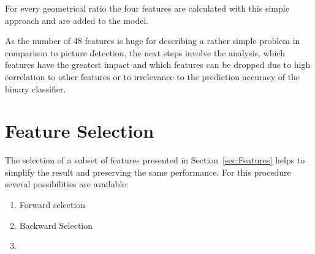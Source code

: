 For every geometrical ratio the four features are calculated with this simple approach and are added to the model.

\parbreak

As the number of 48 features is huge for describing a rather simple problem in comparison to picture detection, the next steps
involve the analysis, which features have the greatest impact and which features can be dropped due to high correlation to other
features or to irrelevance to the prediction accuracy of the binary classifier.

\section{Feature Selection}
\label{sec:feature_engineering}

The selection of a subset of features presented in Section~\ref{sec:Features} helps to simplify the result and preserving the
same performance. For this procedure several possibilities are available:
\begin{enumerate}
    \item Forward selection
    \item Backward Selection
    \item
\end{enumerate}
